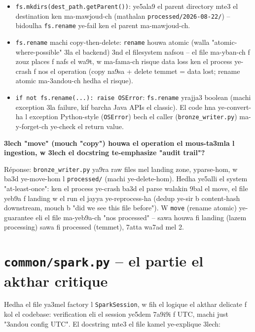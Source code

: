 \documentclass[11pt,a4paper]{report}
\DeclareRobustCommand{\code}[1]{\texttt{#1}}
\DeclareRobustCommand{\file}[1]{\texttt{\color{amber}#1}}
\begin{document}
\begin{itemize}
  \item \code{fs.mkdirs(dest\_path.getParent())}: ye5ala9 el parent directory
        mte3 el destination ken ma-mawjoud-ch (mathalan \code{processed/2026-08-22/})
        -- bidoulha \code{fs.rename} ye-fail ken el parent ma-mawjoud-ch.
  \item \code{fs.rename} machi copy-then-delete: \code{rename} houwa atomic
        (walla "atomic-where-possible" 3la el backend) 3nd el filesystem
        nafsou -- el file ma-yban-ch f zouz places f nafs el wa9t, w ma-fama-ch
        risque data loss ken el process ye-crash f nos el operation (copy
        na9sa + delete temmet = data lost; rename atomic ma-3andou-ch hedha
        el risque).
  \item \code{if not fs.rename(...): raise OSError}: \code{fs.rename} yrajja3
        boolean (machi exception 3la failure, kif barcha Java APIs el classic).
        El code hna ye-convert-ha l exception Python-style (\code{OSError})
        bech el caller (\code{bronze\_writer.py}) ma-y-forget-ch ye-check
        el return value.
\end{itemize}

\begin{soual}
\textbf{3lech "move" (mouch "copy") houwa el operation el mous-ta3mla l
ingestion, w 3lech el docstring te-emphasize "audit trail"?}

Réponse: \code{bronze\_writer.py} ya9ra raw files mel landing zone, yparse-hom,
w ba3d ye-move-hom l \code{processed/} (machi ye-delete-hom). Hedha ye5alli
el system "at-least-once": ken el process ye-crash ba3d el parse walakin
9bal el move, el file yeb9a f landing w el run el jayya ye-reprocess-ha
(dedup ye-sir b content-hash downstream, mouch b "did we see this file
before"). W \code{move} (rename atomic) ye-guarantee eli el file ma-yeb9a-ch
"nos processed" -- sawa houwa fi landing (lazem processing) sawa fi processed
(temmet), 7atta wa7ad mel 2.
\end{soual}

\section{\file{common/spark.py} -- el partie el akthar critique}

Hedha el file ya3mel factory l \code{SparkSession}, w fih el logique el akthar
delicate f kol el codebase: verification eli el session ye5dem 7a9i9i f UTC,
machi just "3andou config UTC". El docstring mte3 el file kamel ye-explique
3lech:
\end{document}

